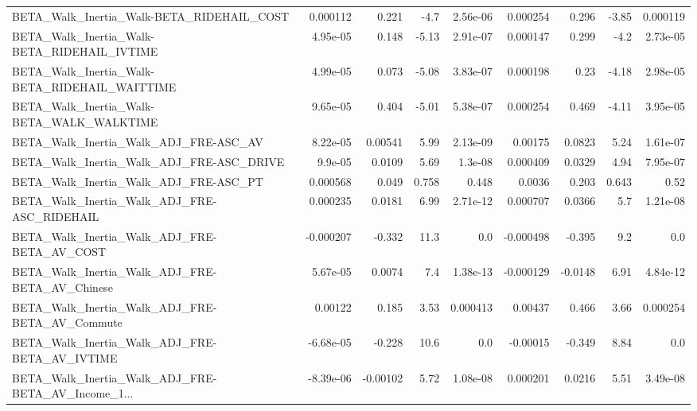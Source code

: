 \begin{tabular}{lrrrrrrrr}
BETA\_Walk\_Inertia\_Walk-BETA\_RIDEHAIL\_COST          &    0.000112 &        0.221 &     -4.7 & 2.56e-06 &   0.000254 &       0.296 &        -3.85 &      0.000119 \\
BETA\_Walk\_Inertia\_Walk-BETA\_RIDEHAIL\_IVTIME        &    4.95e-05 &        0.148 &    -5.13 & 2.91e-07 &   0.000147 &       0.299 &         -4.2 &      2.73e-05 \\
BETA\_Walk\_Inertia\_Walk-BETA\_RIDEHAIL\_WAITTIME      &    4.99e-05 &        0.073 &    -5.08 & 3.83e-07 &   0.000198 &        0.23 &        -4.18 &      2.98e-05 \\
BETA\_Walk\_Inertia\_Walk-BETA\_WALK\_WALKTIME          &    9.65e-05 &        0.404 &    -5.01 & 5.38e-07 &   0.000254 &       0.469 &        -4.11 &      3.95e-05 \\
BETA\_Walk\_Inertia\_Walk\_ADJ\_FRE-ASC\_AV              &    8.22e-05 &      0.00541 &     5.99 & 2.13e-09 &    0.00175 &      0.0823 &         5.24 &      1.61e-07 \\
BETA\_Walk\_Inertia\_Walk\_ADJ\_FRE-ASC\_DRIVE           &     9.9e-05 &       0.0109 &     5.69 &  1.3e-08 &   0.000409 &      0.0329 &         4.94 &      7.95e-07 \\
BETA\_Walk\_Inertia\_Walk\_ADJ\_FRE-ASC\_PT              &    0.000568 &        0.049 &    0.758 &    0.448 &     0.0036 &       0.203 &        0.643 &          0.52 \\
BETA\_Walk\_Inertia\_Walk\_ADJ\_FRE-ASC\_RIDEHAIL        &    0.000235 &       0.0181 &     6.99 & 2.71e-12 &   0.000707 &      0.0366 &          5.7 &      1.21e-08 \\
BETA\_Walk\_Inertia\_Walk\_ADJ\_FRE-BETA\_AV\_COST        &   -0.000207 &       -0.332 &     11.3 &      0.0 &  -0.000498 &      -0.395 &          9.2 &           0.0 \\
BETA\_Walk\_Inertia\_Walk\_ADJ\_FRE-BETA\_AV\_Chinese     &    5.67e-05 &       0.0074 &      7.4 & 1.38e-13 &  -0.000129 &     -0.0148 &         6.91 &      4.84e-12 \\
BETA\_Walk\_Inertia\_Walk\_ADJ\_FRE-BETA\_AV\_Commute     &     0.00122 &        0.185 &     3.53 & 0.000413 &    0.00437 &       0.466 &         3.66 &      0.000254 \\
BETA\_Walk\_Inertia\_Walk\_ADJ\_FRE-BETA\_AV\_IVTIME      &   -6.68e-05 &       -0.228 &     10.6 &      0.0 &   -0.00015 &      -0.349 &         8.84 &           0.0 \\
BETA\_Walk\_Inertia\_Walk\_ADJ\_FRE-BETA\_AV\_Income\_1... &   -8.39e-06 &     -0.00102 &     5.72 & 1.08e-08 &   0.000201 &      0.0216 &         5.51 &      3.49e-08 \\

\end{tabular}
